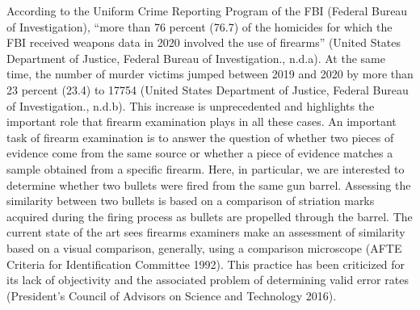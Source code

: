 According to the Uniform Crime Reporting Program of the FBI (Federal Bureau of Investigation), ``more than 76 percent (76.7) of the homicides for which the FBI received weapons data in 2020 involved the use of firearms'' (United States Department of Justice, Federal Bureau of Investigation., n.d.a). At the same time, the number of murder victims jumped between 2019 and 2020 by more than 23 percent (23.4) to 17754 (United States Department of Justice, Federal Bureau of Investigation., n.d.b). This increase is unprecedented and highlights the important role that firearm examination plays in all these cases.
An important task of firearm examination is to answer the question of whether two pieces of evidence come from the same source or whether a piece of evidence matches a sample obtained from a specific firearm.
Here, in particular, we are interested to determine whether two bullets were fired from the same gun barrel.
Assessing the similarity between two bullets is based on a comparison of striation marks acquired during the firing process as bullets are propelled through the barrel.
The current state of the art sees firearms examiners make an assessment of similarity based on a visual comparison, generally, using a comparison microscope (AFTE Criteria for Identification Committee 1992).
This practice has been criticized for its lack of objectivity and the associated problem of determining valid error rates (President's Council of Advisors on Science and Technology 2016).


